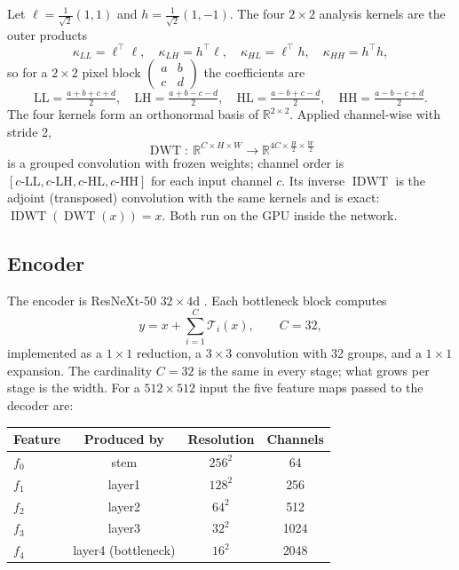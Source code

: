 \documentclass[11pt]{article}
\newcommand{\R}{\mathbb{R}}
\newcommand{\DWT}{\operatorname{DWT}}
\newcommand{\IDWT}{\operatorname{IDWT}}
\begin{document}
Let $\ell = \tfrac{1}{\sqrt2}(1,1)$ and $h = \tfrac{1}{\sqrt2}(1,-1)$. The four $2\times2$ analysis
kernels are the outer products
\begin{equation}
  \kappa_{LL} = \ell^\top\ell,\quad \kappa_{LH} = h^\top\ell,\quad
  \kappa_{HL} = \ell^\top h,\quad \kappa_{HH} = h^\top h,
\end{equation}
so for a $2\times2$ pixel block $\begin{pmatrix} a & b \\ c & d\end{pmatrix}$ the coefficients are
\begin{equation}
\label{eq:haar}
  \mathrm{LL} = \tfrac{a+b+c+d}{2},\quad
  \mathrm{LH} = \tfrac{a+b-c-d}{2},\quad
  \mathrm{HL} = \tfrac{a-b+c-d}{2},\quad
  \mathrm{HH} = \tfrac{a-b-c+d}{2}.
\end{equation}
The four kernels form an orthonormal basis of $\R^{2\times2}$. Applied channel-wise with stride 2,
\begin{equation*}
  \DWT:\ \R^{C\times H\times W}\to\R^{4C\times \frac H2\times\frac W2}
\end{equation*}
is a grouped convolution with frozen weights; channel order is $[c\text{-LL}, c\text{-LH}, c\text{-HL}, c\text{-HH}]$ for each
input channel $c$. Its inverse $\IDWT$ is the adjoint (transposed) convolution with the same
kernels and is exact: $\IDWT(\DWT(x)) = x$. Both run on the GPU inside the network.

\subsection{Encoder}

The encoder is ResNeXt-50 $32\times4$d \cite{xie2017}. Each bottleneck block computes
\begin{equation}
  y = x + \sum_{i=1}^{C} \mathcal{T}_i(x),\qquad C = 32,
\end{equation}
implemented as a $1\times1$ reduction, a $3\times3$ convolution with 32 groups, and a $1\times1$
expansion. The cardinality $C=32$ is the same in every stage; what grows per stage is the width.
For a $512\times512$ input the five feature maps passed to the decoder are:

\begin{table}[h]
\centering
\begin{tabular}{@{}lccc@{}}
\toprule
Feature & Produced by & Resolution & Channels \\
\midrule
$f_0$ & stem & $256^2$ & 64 \\
$f_1$ & layer1 & $128^2$ & 256 \\
$f_2$ & layer2 & $64^2$ & 512 \\
$f_3$ & layer3 & $32^2$ & 1024 \\
$f_4$ & layer4 (bottleneck) & $16^2$ & 2048 \\
\bottomrule
\end{tabular}
\end{table}
\end{document}
